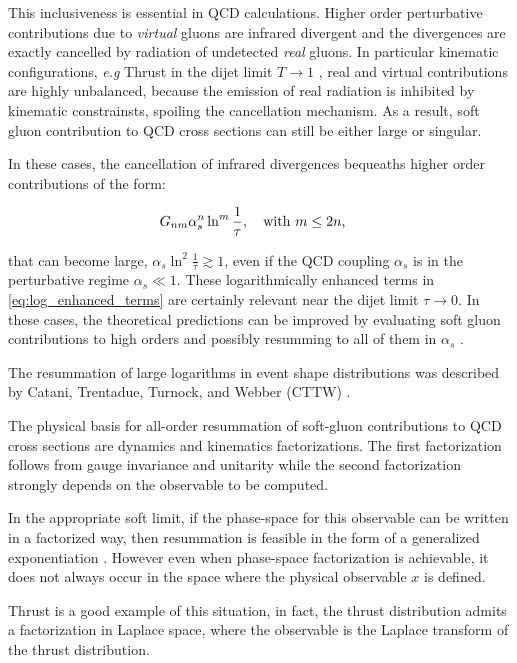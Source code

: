 \documentclass[../main.tex]{subfiles}
\begin{document}
This inclusiveness is essential in QCD calculations. Higher order perturbative contributions due to \emph{virtual}
gluons are infrared divergent and the divergences are exactly  cancelled by radiation of undetected \emph{real} gluons.
In particular kinematic configurations, \emph{e.g} Thrust in the dijet limit $T \to 1$ ,   
real and virtual contributions are highly unbalanced, because the emission of real radiation is inhibited by kinematic constrainsts,
spoiling the cancellation mechanism. As a result, soft gluon contribution to QCD cross sections can still be either large or singular.

In these cases, the cancellation of infrared divergences bequeaths higher order contributions of the form:

\begin{equation}\label{eq:log_enhanced_terms}
    G_{nm} \alpha_s^n \ln^m \frac{1}{\tau} , \qq{with $m \le 2n $,}
\end{equation}

that can become large, $\alpha_s \ln^2\frac{1}{\tau}\gtrsim 1$, even if the QCD coupling $\alpha_s$ is in the perturbative regime $\alpha_s \ll 1$.
These logarithmically enhanced terms in \cref{eq:log_enhanced_terms} are certainly relevant near the dijet limit $\tau \to 0$.
In these cases, the theoretical predictions can be improved by evaluating soft gluon 
contributions to high orders and possibly resumming to all of them in $\alpha_s$ \cite{CATANI1991491,Monni:2011gb}.

The resummation of large logarithms in event shape distributions was described by Catani, Trentadue, Turnock, and Webber (CTTW) \cite{CATANI19933}.

The physical basis for all-order resummation of soft-gluon contributions to QCD cross sections are dynamics and kinematics factorizations. The first factorization follows from 
gauge invariance and unitarity while the second factorization strongly depends on the observable to be computed.

In the appropriate soft limit, if the phase-space for this observable can be written in a factorized way, then resummation is feasible in the form of a generalized exponentiation \cite{Sterman:1986aj}.
However even when phase-space factorization is achievable, it does not always occur in the space where the physical observable $x$ is defined.

Thrust is a good example of this situation, in fact, the thrust distribution admits a factorization in Laplace space, 
where the observable is the Laplace transform of the thrust distribution. 
\end{document}
